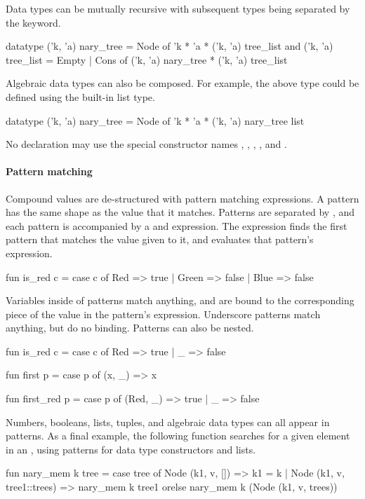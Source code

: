 \documentclass[12pt,a4paper]{book}
\begin{document}
Data types can be mutually recursive with subsequent types being separated by
the  keyword.
\begin{smlcode}
datatype ('k, 'a) nary_tree =
  Node of 'k * 'a * ('k, 'a) tree_list
and ('k, 'a) tree_list =
  Empty
| Cons of ('k, 'a) nary_tree * ('k, 'a) tree_list
\end{smlcode}

Algebraic data types can also be composed. For example, the above
 type could be defined using the built-in list type.
\begin{smlcode}
datatype ('k, 'a) nary_tree =
  Node of 'k * 'a * ('k, 'a) nary_tree list
\end{smlcode}

No  declaration may use the special constructor names
, , , \smlinline{::}, and
. 


\paragraph{Pattern matching}
Compound values are de-structured with pattern matching 
expressions. A pattern has the same shape as the value that it matches. Patterns are separated by \smlinline{|}, and each pattern is accompanied by a \smlinline{=>} and expression. The  expression finds the first pattern that matches the value given to it, and evaluates that pattern's expression.
\begin{smlcode}
fun is_red c =
  case c of
    Red => true
  | Green => false
  | Blue => false
\end{smlcode}

Variables inside of patterns match anything, and are bound to the corresponding piece of the value in the pattern's expression. Underscore \smlinline{_} patterns match anything, but do no binding. Patterns can also be nested.
\begin{smlcode}
fun is_red c =
  case c of
    Red => true
  | _ => false

fun first p =
  case p of
    (x, _) => x

fun first_red p =
  case p of
    (Red, _) => true
  | _ => false
\end{smlcode}

Numbers, booleans, lists, tuples, and algebraic data types can all appear in
patterns. As a final example, the following function searches for a given
element in an , using patterns for data type constructors and lists.
\begin{smlcode}
fun nary_mem k tree =
  case tree of
    Node (k1, v, []) => k1 = k
  | Node (k1, v, tree1::trees) =>
    nary_mem k tree1 orelse nary_mem k (Node (k1, v, trees))
\end{smlcode}
\end{document}
